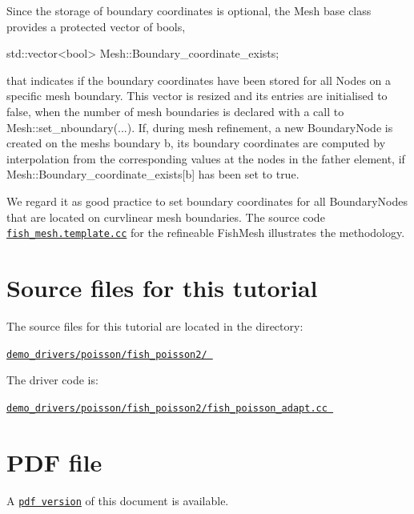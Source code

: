 Since the storage of boundary coordinates is optional, the {\ttfamily Mesh} base class provides a protected vector of bools, 
\begin{DoxyCode}
std::vector<bool> Mesh::Boundary\_coordinate\_exists;
\end{DoxyCode}
 that indicates if the boundary coordinates have been stored for all {\ttfamily Nodes} on a specific mesh boundary. This vector is resized and its entries are initialised to {\ttfamily false}, when the number of mesh boundaries is declared with a call to {\ttfamily Mesh\+::set\+\_\+nboundary}(...). If, during mesh refinement, a new {\ttfamily Boundary\+Node} is created on the mesh\textquotesingle{}s boundary {\ttfamily b}, its boundary coordinates are computed by interpolation from the corresponding values at the nodes in the father element, if {\ttfamily Mesh\+::\+Boundary\+\_\+coordinate\+\_\+exists}\mbox{[}b\mbox{]} has been set to {\ttfamily true}.

We regard it as good practice to set boundary coordinates for all {\ttfamily Boundary\+Nodes} that are located on curvlinear mesh boundaries. The source code \href{../../../../src/meshes/fish_mesh.template.cc}{\tt fish\+\_\+mesh.\+template.\+cc} for the refineable Fish\+Mesh illustrates the methodology.



 

\hypertarget{index_sources}{}\section{Source files for this tutorial}\label{index_sources}

\begin{DoxyItemize}
\item The source files for this tutorial are located in the directory\+: \begin{center} \href{../../../../demo_drivers/poisson/fish_poisson2/}{\tt demo\+\_\+drivers/poisson/fish\+\_\+poisson2/ } \end{center} 
\item The driver code is\+: \begin{center} \href{../../../../demo_drivers/poisson/fish_poisson2/fish_poisson_adapt.cc}{\tt demo\+\_\+drivers/poisson/fish\+\_\+poisson2/fish\+\_\+poisson\+\_\+adapt.\+cc } \end{center} 
\end{DoxyItemize}

 

 \hypertarget{index_pdf}{}\section{P\+D\+F file}\label{index_pdf}
A \href{../latex/refman.pdf}{\tt pdf version} of this document is available. 

